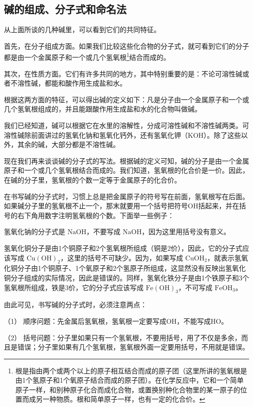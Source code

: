 \subsection{碱的组成、分子式和命名法}

从上面所谈的几种碱里，可以看到它们的共同特征。

首先，在分子组成方面。如果我们比较这些化合物的分子式，就可看到它们的分子都是由一个金属原子和一个或几个氢氧根\footnote{根是指由两个或两个以上的原子相互结合而成的原子团（这里所讲的氢氧根是由1个氢原子和1个氧原子结合而成的原子团）。在化学反应中，它和一个简单原子一样，和别种原子化合而成化合物，或置换别种化合物里的某一原子的位置而成另一种物质。根和简单原子一样，也有一定的化合价。}结合而成的。

其次，在性质方面。它们有许多共同的地方，其中特别重要的是：不论可溶性碱或者不溶性碱，都能和酸作用生成盐和水。

根据这两方面的特征，可以得出碱的定义如下：凡是分子由一个金属原子和一个或几个氢氧根组成的，并且能跟酸作用生成盐和水的化合物叫做碱。

我们已经知道，碱可以根据它在水里的溶解性，分成可溶性碱和不溶性碱两类。可溶性碱除前面讲过的氢氧化钠和氢氧化钙外，还有氢氧化钾（KOH）。除了这些以外，其余的碱，大部分都是不溶性碱。

现在我们再来谈谈碱的分子式的写法。根据碱的定义可知，碱的分子是由一个金属原子和一个或几个氢氧根结合而成的。我们知道，氢氧根的化合价是一价。因此，在碱的分子里，氢氧根的个数一定等于金属原子的化合价。

在书写碱的分子式时，习惯上总是把金属原子的符号写在前面，氢氧根写在后面。如果碱分子里的氢氧根不止一个，那末就要用一个括号把符号OH括起来，并在括号的右下角用数字注明氢氧根的个数。下面举一些例子：

氢氧化钠的分子式是 \(\mathrm{NaOH}\)，不要写成
\(\mathrm{NaOH}\)，因为这里用括号没有意义。

氢氧化铜分子是由1个铜原子和2个氢氧根所组成（铜是2价），因此，它的分子式应该写成
\(\mathrm{Cu(OH)}_2\)，这里的括号不可缺少。因为，如果写成
\(\mathrm{CuOH}_2\)，就表示氢氧化铜分子由1个铜原子、1个氧原子和2个氢原子所组成，这显然没有反映出氢氧化铜分子组成的实际情况，因此是错误的。同样，氢氧化铁分子是由1个铁原子和3个氢氧根所组成，铁是3价，它的分子式应该写成
\(\mathrm{Fe(OH)}_3\)，不可写成 \(\mathrm{FeOH}_3\)。

由此可见，书写碱的分子式时，必须注意两点：

（1） 顺序问题：先金属后氢氧根，氢氧根一定要写成OH，不能写成HO。

（2）
括号问题：分子里如果只有一个氢氧根，不要用括号，用了不仅是多余，而且是错误；分子里如果有几个氢氧根，氢氧根外面一定要用括号，不用就是错误。

